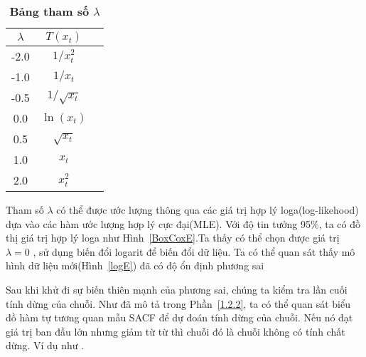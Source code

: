 \documentclass[twoside,12pt]{Latex/Classes/PhDthesisPSnPDF}
\begin{document}
\begin{table}[htdp]
\centering
\begin{tabular}{ccc} %
\hline
{\bf $\lambda$} & {\bf $T(x_t)$}  \\ 
\hline %

-2.0 & ${1}/{x_t^2}$  \\
-1.0 & ${1}/{x_t}$  \\
-0.5 & ${1}/{\sqrt{x_t}}$  \\
0.0  & $\ln(x_t)$  \\
0.5 & $\sqrt{x_t}$  \\
1.0 &  $x_t$ \\
2.0 &  $x_t^2$ \\
\end{tabular}
\caption[title of table]{\textbf{Bảng tham số $\lambda$}}
\label{lambda} %
\end{table}

Tham số $\lambda$ có thể được ước lượng thông qua các giá trị hợp lý loga(log-likehood) dựa vào các hàm ước lượng hợp lý cực đại(MLE). Với độ tin tưởng 95$\%$, ta có đồ thị giá trị hợp lý loga như Hình~\ref{BoxCoxE}.Ta thấy có thể chọn được giá trị $\lambda = 0$ , sử dụng biến đổi logarit để biến đổi dữ liệu. Ta có thể quan sát thấy mô hình dữ liệu mới(Hình~\ref{logE}) đã có độ ổn định phương sai



Sau khi khử đi sự biến thiên mạnh của phương sai, chúng ta kiểm tra lần cuối tính dừng của chuỗi. Như đã mô tả trong Phần~\ref{1.2.2}, ta có thể quan sát biểu đồ hàm tự tương quan mẫu SACF để dự đoán tính dừng của chuỗi. Nếu nó đạt giá trị ban đầu lớn nhưng giảm từ từ thì chuỗi đó là chuỗi không có tính chất dừng. Ví dụ như . 
\end{document}
